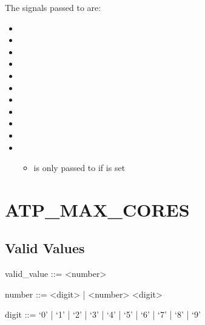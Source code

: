 \documentclass[letterpaper,10pt,english]{sphinxmanual}
\begin{document}
\sphinxAtStartPar
The signals passed to  are:
\begin{itemize}
\item {} 
\sphinxAtStartPar
{}

\item {} 
\sphinxAtStartPar
{}

\item {} 
\sphinxAtStartPar
{}

\item {} 
\sphinxAtStartPar
{}

\item {} 
\sphinxAtStartPar
{}

\item {} 
\sphinxAtStartPar
{}

\item {} 
\sphinxAtStartPar
{}

\item {} 
\sphinxAtStartPar
{}

\item {} 
\sphinxAtStartPar
{}

\item {} 
\sphinxAtStartPar
{}

\item {} 
\sphinxAtStartPar
{}
\begin{itemize}
\item {} 
\sphinxAtStartPar
{} is only passed to  if {\hyperref[\detokenize{flag/flag:atp-ignore-sigterm}]{}} is set

\end{itemize}

\end{itemize}


\section{ATP\_MAX\_CORES}
\label{\detokenize{flag/flag:atp-max-cores}}\label{\detokenize{flag/flag:id44}}

\subsection{Valid Values}
\label{\detokenize{flag/flag:id45}}
\begin{DUlineblock}{0em}
\item[] valid\_value ::= \textless{}number\textgreater{}
\item[] number ::= \textless{}digit\textgreater{} | \textless{}number\textgreater{} \textless{}digit\textgreater{}
\item[] digit ::= ‘0’ | ‘1’ | ‘2’ | ‘3’ | ‘4’ | ‘5’ | ‘6’ | ‘7’ | ‘8’ | ‘9’
\end{DUlineblock}
\end{document}
